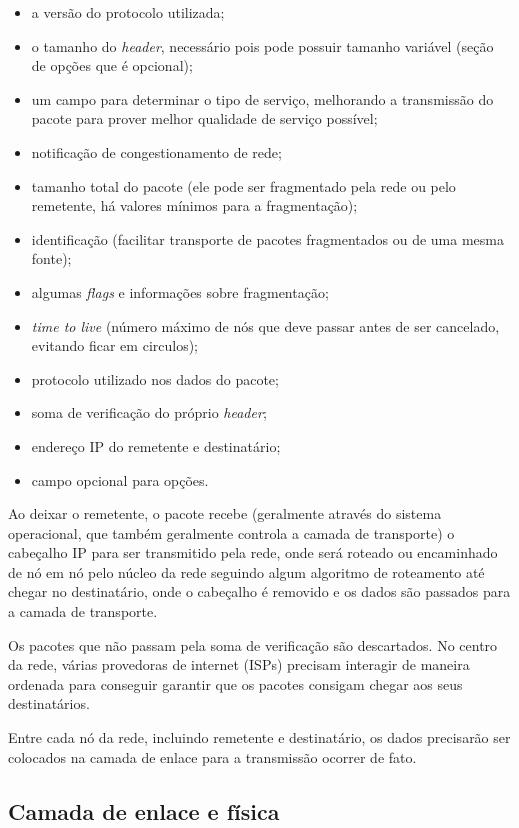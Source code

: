 \documentclass[brazilian,a4paper,twocolumn]{article}
\begin{document}
\begin{itemize}
    \item a versão do protocolo utilizada;
    \item o tamanho do \textit{header}, necessário pois pode possuir tamanho variável (seção de opções que é opcional);
    \item um campo para determinar o tipo de serviço, melhorando a transmissão do pacote para prover melhor qualidade de serviço possível;
    \item notificação de congestionamento de rede;
    \item tamanho total do pacote (ele pode ser fragmentado pela rede ou pelo remetente, há valores mínimos para a fragmentação);
    \item identificação (facilitar transporte de pacotes fragmentados ou de uma mesma fonte);
    \item algumas \textit{flags} e informações sobre fragmentação;
    \item \textit{time to live} (número máximo de nós que deve passar antes de ser cancelado, evitando ficar em circulos);
    \item protocolo utilizado nos dados do pacote;
    \item soma de verificação do próprio \textit{header};
    \item endereço IP do remetente e destinatário;
    \item campo opcional para opções.
\end{itemize}

Ao deixar o remetente, o pacote recebe (geralmente através do sistema operacional, que também geralmente controla a camada de transporte) o cabeçalho IP para ser transmitido pela rede, onde será roteado ou encaminhado de nó em nó pelo núcleo da rede seguindo algum algoritmo de roteamento até chegar no destinatário, onde o cabeçalho é removido e os dados são passados para a camada de transporte.

Os pacotes que não passam pela soma de verificação são descartados. No centro da rede, várias provedoras de internet (ISPs) precisam interagir de maneira ordenada para conseguir garantir que os pacotes consigam chegar aos seus destinatários.

Entre cada nó da rede, incluindo remetente e destinatário, os dados precisarão ser colocados na camada de enlace para a transmissão ocorrer de fato.


\subsection{Camada de enlace e física}
\end{document}
